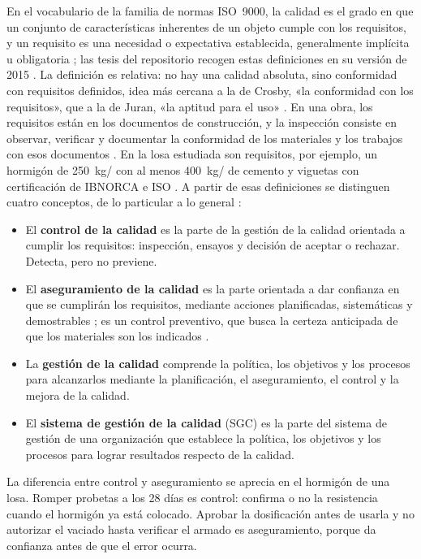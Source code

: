 En el vocabulario de la familia de normas ISO~9000, la calidad es el grado en que un conjunto de características inherentes de un objeto cumple con los requisitos, y un requisito es una necesidad o expectativa establecida, generalmente implícita u obligatoria \parencite{iso9000_2026}; las tesis del repositorio recogen estas definiciones en su versión de 2015 \parencite[pp.~21--22]{mamanicalsina2025}. La definición es relativa: no hay una calidad absoluta, sino conformidad con requisitos definidos, idea más cercana a la de Crosby, «la conformidad con los requisitos», que a la de Juran, «la aptitud para el uso» \parencite[pp.~24, 31]{cepeda2017}. En una obra, los requisitos están en los documentos de construcción, y la inspección consiste en observar, verificar y documentar la conformidad de los materiales y los trabajos con esos documentos \parencite[sección~2.3]{aci318_2025}. En la losa estudiada son requisitos, por ejemplo, un hormigón de 250~kg/\cmdos{} con al menos 400~kg/\mtres{} de cemento y viguetas con certificación de IBNORCA e ISO \parencite[p.~3]{uatf_et}. A partir de esas definiciones se distinguen cuatro conceptos, de lo particular a lo general \parencite{iso9000_2026}:
\begin{itemize}
  \item El \textbf{control de la calidad} es la parte de la gestión de la calidad orientada a cumplir los requisitos: inspección, ensayos y decisión de aceptar o rechazar. Detecta, pero no previene.
  \item El \textbf{aseguramiento de la calidad} es la parte orientada a dar confianza en que se cumplirán los requisitos, mediante acciones planificadas, sistemáticas y demostrables \parencite[p.~21]{alfaro2011}; es un control preventivo, que busca la certeza anticipada de que los materiales son los indicados \parencite[p.~60]{cajias2023}.
  \item La \textbf{gestión de la calidad} comprende la política, los objetivos y los procesos para alcanzarlos mediante la planificación, el aseguramiento, el control y la mejora de la calidad.
  \item El \textbf{sistema de gestión de la calidad} (SGC) es la parte del sistema de gestión de una organización que establece la política, los objetivos y los procesos para lograr resultados respecto de la calidad.
\end{itemize}
La diferencia entre control y aseguramiento se aprecia en el hormigón de una losa. Romper probetas a los 28 días es control: confirma o no la resistencia cuando el hormigón ya está colocado. Aprobar la dosificación antes de usarla y no autorizar el vaciado hasta verificar el armado es aseguramiento, porque da confianza antes de que el error ocurra.

